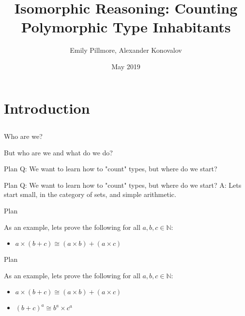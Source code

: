 \documentclass[tikz]{beamer}
\title{Isomorphic Reasoning: Counting Polymorphic Type Inhabitants}
\author{Emily Pillmore, Alexander Konovalov}
\date{May 2019}
\theoremstyle{definition}
\begin{document}
\maketitle

\section{Introduction}
\subsection{}

\begin{frame}{Who are we?}

But who are we and what do we do?

\end{frame}

\begin{frame}{Plan}
    Q: We want to learn how to "count" types, but where do we start? 
\end{frame}{}

\begin{frame}{Plan}
    Q: We want to learn how to "count" types, but where do we start? 
    \newline
    A: Lets start small, in the category of sets, and simple arithmetic.
\end{frame}{}

\begin{frame}{Plan}

As an example, lets prove the following for all $a, b, c \in \mathbb{N}$:

\begin{itemize}
    \item $a \times (b + c) \cong (a \times b) + (a \times c)$
\end{itemize}

\end{frame}

\begin{frame}{Plan}

As an example, lets prove the following for all $a, b, c \in \mathbb{N}$:

\begin{itemize}
    \item $a \times (b + c) \cong (a \times b) + (a \times c)$
    \item $(b + c)^a \cong b^a \times c^a$
\end{itemize}

\end{frame}
\end{document}
